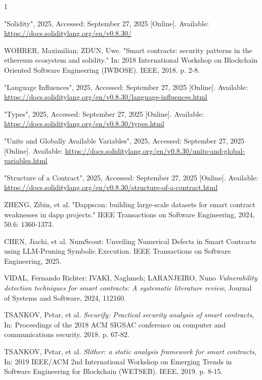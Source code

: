 \documentclass[10pt, conference]{IEEEtran}
\begin{document}
\begin{thebibliography}{1}

     "Solidity", 2025, Accessed: September 27, 2025 [Online]. Available: \url{https://docs.soliditylang.org/en/v0.8.30/}   

     WOHRER, Maximilian; ZDUN, Uwe. "Smart contracts: security patterns in the ethereum ecosystem and solidity." In: 2018 International Workshop on Blockchain Oriented Software Engineering (IWBOSE). IEEE, 2018. p. 2-8.

     "Language Influences", 2025, Accessed: September 27, 2025 [Online]. Available: \url{https://docs.soliditylang.org/en/v0.8.30/language-influences.html}

     "Types", 2025, Accessed: September 27, 2025 [Online]. Available: \url{https://docs.soliditylang.org/en/v0.8.30/types.html}

     "Units and Globally Available Variables", 2025, Accessed: September 27, 2025 [Online]. Available: \url{https://docs.soliditylang.org/en/v0.8.30/units-and-global-variables.html}

     "Structure of a Contract", 2025, Accessed: September 27, 2025 [Online]. Available: \url{https://docs.soliditylang.org/en/v0.8.30/structure-of-a-contract.html} 

     ZHENG, Zibin, et al. "Dappscan: building large-scale datasets for smart contract weaknesses in dapp projects." IEEE Transactions on Software Engineering, 2024, 50.6: 1360-1373.

     CHEN, Jiachi, et al. NumScout: Unveiling Numerical Defects in Smart Contracts using LLM-Pruning Symbolic Execution. IEEE Transactions on Software Engineering, 2025.

     VIDAL, Fernando Richter; IVAKI, Naghmeh; LARANJEIRO, Nuno \emph{Vulnerability detection techniques for smart contracts: A systematic literature review}, Journal of Systems and Software, 2024, 112160.
    
     TSANKOV, Petar, et al. \emph{Securify: Practical security analysis of smart contracts}, In: Proceedings of the 2018 ACM SIGSAC conference on computer and communications security. 2018. p. 67-82.

     TSANKOV, Petar, et al. \emph{Slither: a static analysis framework for smart contracts}, In: 2019 IEEE/ACM 2nd International Workshop on Emerging Trends in Software Engineering for Blockchain (WETSEB). IEEE, 2019. p. 8-15.


\end{thebibliography}
\end{document}
